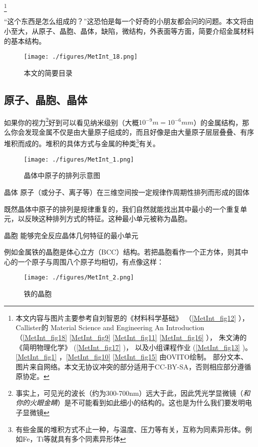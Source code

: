 
\footnote{本文内容与图片主要参考自刘智恩的《材料科学基础》
（\autoref{MetInt_fig12} ），
Callister的 Material Science and Engineering An Introduction
（\autoref{MetInt_fig18} \autoref{MetInt_fig9} \autoref{MetInt_fig11} \autoref{MetInt_fig16} ），
朱文涛的《简明物理化学》
(\autoref{MetInt_fig17} )，
以及小组课程作业
(\autoref{MetInt_fig13} )。 
\autoref{MetInt_fig1} ，\autoref{MetInt_fig10} \autoref{MetInt_fig15} 由OVITO绘制。
部分文本、图片来自网络。本文无协议冲突的部分适用于CC-BY-SA，否则相应部分遵循原协定。}

“这个东西是怎么组成的？”这恐怕是每一个好奇的小朋友都会问的问题。本文将由小至大，从原子、晶胞、晶体，缺陷，微结构，外表面等方面，简要介绍金属材料的基本结构。
\begin{figure}[ht]
\centering
\texttt{[image: ./figures/MetInt\_18.png]}
\caption{本文的简要目录} \label{MetInt_fig18}
\end{figure}

\subsection{原子、晶胞、晶体}
如果你的视力\footnote{事实上，可见光的波长（约为300-700nm）远大于此，因此凭光学显微镜（\textsl{和你的火眼金睛}）是不可能看到如此细小的结构的。这也是为什么我们要发明电子显微镜}好到可以看见纳米级别（大概$10^{-9}m =10^{-6} mm$）的金属结构，那么你会发现金属不仅是由大量原子组成的，而且好像是由大量原子层层叠叠、有序堆积而成的。堆积的具体方式与金属的种类\footnote{有些金属的堆积方式不止一种，与温度、压力等有关，互称为同素异形体。例如Fe，Ti等就具有多个同素异形体}有关。

\begin{figure}[ht]
\centering
\texttt{[image: ./figures/MetInt\_1.png]}
\caption{晶体中原子的排列示意图} \label{MetInt_fig1}
\end{figure}

\begin{definition}{晶体}
原子（或分子、离子等）在三维空间按一定规律作周期性排列而形成的固体
\end{definition}

既然晶体中原子的排列是规律重复的，我们自然就能找出其中最小的一个重复单元，以反映这种排列方式的特征。这种最小单元被称为晶胞。
\begin{definition}{晶胞}
能够完全反应晶体几何特征的最小单元
\end{definition}
例如金属铁的晶胞是体心立方（BCC）结构。若把晶胞看作一个正方体，则其中心的一个原子与周围八个原子均相切，有点像这样：
\begin{figure}[ht]
\centering
\texttt{[image: ./figures/MetInt\_2.png]}
\caption{铁的晶胞} \label{MetInt_fig2}
\end{figure}

